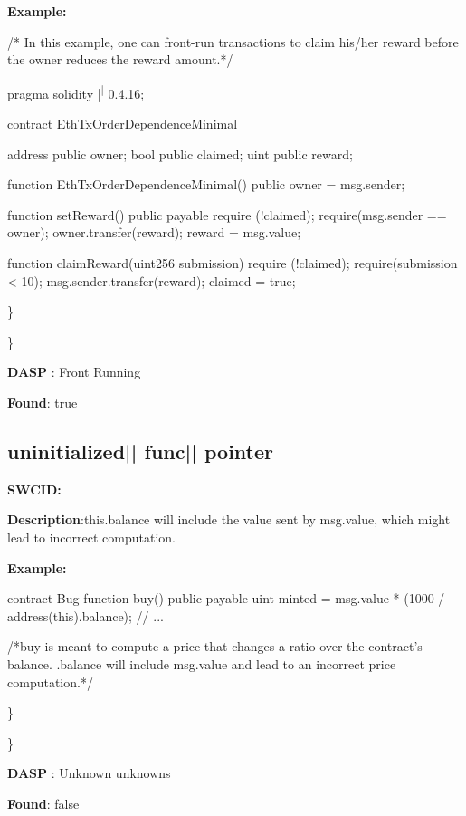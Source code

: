 \documentclass{article}
\begin{document}
\textbf{Example:} 
\begin{ffcode} 

/* In this example, one can front-run transactions to claim his/her reward before the owner reduces the reward amount.*/ 

pragma solidity |\textsuperscript| 0.4.16;

contract EthTxOrderDependenceMinimal {
    address public owner;
    bool public claimed;
    uint public reward;

    function EthTxOrderDependenceMinimal() public {
        owner = msg.sender;
    }

    function setReward() public payable {
        require (!claimed);
        require(msg.sender == owner);
        owner.transfer(reward);
        reward = msg.value;
    }

    function claimReward(uint256 submission) {
        require (!claimed);
        require(submission < 10);
        msg.sender.transfer(reward);
        claimed = true;
    }
}

\end{ffcode} 
\} 

\} 

\textbf{DASP} : Front Running

\textbf{Found}: true

\subsection{uninitialized{|\textunderscore| }func{|\textunderscore| }pointer} 
\textbf{SWC{\textunderscore }ID:} 

\textbf{Description}:this.balance will include the value sent by msg.value, which might lead to incorrect computation.


\textbf{Example:} 
\begin{ffcode} 

contract Bug{
  function buy() public payable{
    uint minted = msg.value * (1000 / address(this).balance);
    // ...
  }
}

 /*buy is meant to compute a price that changes a ratio over the contract's balance. .balance will include msg.value and lead to an incorrect price computation.*/ 

\end{ffcode} 
\} 

\} 

\textbf{DASP} : Unknown unknowns

\textbf{Found}: false
\end{document}
